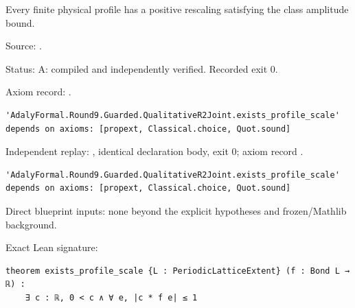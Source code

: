 \begin{theorem}[bp-125]
\label{bp-125}
\uses{}
\leanok
Every finite physical profile has a positive rescaling satisfying the class amplitude bound.

\par Source: \texttt{}.
\par Status: A: compiled and independently verified. Recorded exit 0.
\par Axiom record: \texttt{}.
\begin{verbatim}
'AdalyFormal.Round9.Guarded.QualitativeR2Joint.exists_profile_scale' depends on axioms: [propext, Classical.choice, Quot.sound]
\end{verbatim}
\par Independent replay: \texttt{}, identical declaration body, exit 0; axiom record \texttt{}.
\begin{verbatim}
'AdalyFormal.Round9.Guarded.QualitativeR2Joint.exists_profile_scale' depends on axioms: [propext, Classical.choice, Quot.sound]
\end{verbatim}
\par Direct blueprint inputs: none beyond the explicit hypotheses and frozen/Mathlib background.
\par Exact Lean signature:
\begin{verbatim}
theorem exists_profile_scale {L : PeriodicLatticeExtent} (f : Bond L → ℝ) :
    ∃ c : ℝ, 0 < c ∧ ∀ e, |c * f e| ≤ 1
\end{verbatim}
\end{theorem}

